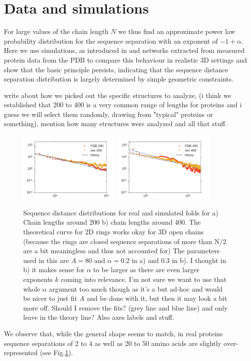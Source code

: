 \documentclass[reprint,amsmath,amssymb,rmp,onecolumn,notitlepage,11pt]{revtex4-1}
\newcommand{\red}[1]{\textcolor{red!80!black}{#1}}
\begin{document}
\section*{Data and simulations}
 For large values of the chain length $N$ we thus find an approximate power law probability distribution for the sequence separation with an exponent of $-1+\alpha$. Here we use simulations, as introduced in \cite{molkenthin2020self} and networks extracted from measured protein data from the PDB \cite{PDB} to compare this behaviour in realistic 3D settings and show that the basic principle persists, indicating that the sequence distance separation distribution is largely determined by simple geometric constraints.
 
 \red{write about how we picked out the specific structures to analyze, (i think we established that 200 to 400 is a very common range of lengths for proteins and i guess we will select them randomly, drawing from "typical" proteins or something), mention how many structures were analyzed and all that stuff.}
 
\begin{figure}[h]
        \centering
	\includegraphics[width=0.45\textwidth]{figures/both_200.pdf}
	\includegraphics[width=0.45\textwidth]{figures/both_400.pdf}
        \caption{Sequence distance distributions for real and simulated folds for a) Chain lengths around 200 b) chain lengths around 400. The theoretical curve for 2D rings works okay for 3D open chains (because the rings are closed sequence separations of more than N/2 are a bit meaningless and thus not accounted for) The parameters used in this are $A=80$ and $\alpha=0.2$ in a) and $0.3$ in b). I thought in b) it makes sense for $\alpha$ to be larger as there are even larger exponents $k$ coming into relevance. I'm not sure we want to use that whole $\alpha$ argument too much though as it's a but ad-hoc and would be nicer to just fit $A$ and be done with it, but then it may look a bit more off. \red{Should I remove the fits? (grey line and blue line) and only leave in the theory line? Also axes labels and stuff.}
        }
        \label{fig:sdd}
\end{figure}
We observe that, while the general shape seems to match, in real proteins sequence separations of 2 to 4 as well as 20 to 50 amino acids are slightly over-represented (see Fig.\ref{fig:sdd}).
\end{document}
